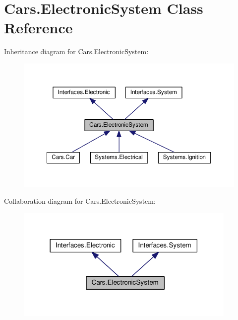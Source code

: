 \hypertarget{classCars_1_1ElectronicSystem}{}\section{Cars.\+Electronic\+System Class Reference}
\label{classCars_1_1ElectronicSystem}


Inheritance diagram for Cars.\+Electronic\+System\+:\nopagebreak
\begin{figure}[H]
\begin{center}
\leavevmode
\includegraphics[width=350pt]{classCars_1_1ElectronicSystem__inherit__graph}
\end{center}
\end{figure}


Collaboration diagram for Cars.\+Electronic\+System\+:\nopagebreak
\begin{figure}[H]
\begin{center}
\leavevmode
\includegraphics[width=302pt]{classCars_1_1ElectronicSystem__coll__graph}
\end{center}
\end{figure}
